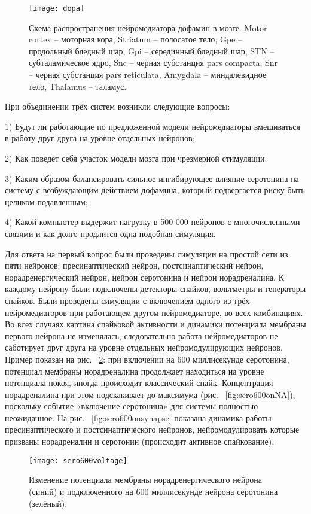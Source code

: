 \begin{figure}
	\centering
	\texttt{[image: dopa]}
	\caption{Схема распространения нейромедиатора дофамин в мозге. Motor cortex – моторная кора, Striatum – полосатое тело, Gpe -- продольный бледный шар, Gpi – серединный бледный шар, STN – субталамическое ядро, Snc -- черная субстанция pars compacta, Snr – черная субстанция pars reticulata, Amygdala – миндалевидное тело, Thalamus – таламус.}
	\label{fig:dopa_scheme}
\end{figure}

При объединении трёх систем возникли следующие вопросы:


1) Будут ли работающие по предложенной модели нейромедиаторы вмешиваться в работу друг друга на уровне отдельных нейронов;


2) Как поведёт себя участок модели мозга при чрезмерной стимуляции.


3) Каким образом балансировать сильное ингибирующее влияние серотонина на систему с возбуждающим действием дофамина, который подвергается риску быть целиком подавленным;


4) Какой компьютер выдержит нагрузку в 500 000 нейронов с многочисленными связями и как долго продлится одна подобная симуляция.


Для ответа на первый вопрос были проведены симуляции на простой сети из пяти нейронов: пресинаптический нейрон, постсинаптический нейрон, норадренергический нейрон, нейрон серотонина и нейрон норадреналина. К каждому нейрону были подключены детекторы спайков, вольтметры и генераторы спайков. Были проведены симуляции с включением одного из трёх нейромедиаторов при работающем другом нейромедиаторе, во всех комбинациях. Во всех случаях картина спайковой активности и динамики потенциала мембраны первого нейрона не изменялась, следовательно работа нейромедиаторов не саботирует друг друга на уровне отдельных нейромодулирующих нейронов. Пример показан на рис. ~\ref{fig:sero600voltage}: при включении на 600 миллисекунде серотонина, потенциал мембраны норадреналина продолжает находиться на уровне потенциала покоя, иногда происходит классический спайк. Концентрация норадреналина при этом подскакивает до максимума (рис. ~\ref{fig:sero600onNA}), поскольку событие «включение серотонина» для системы полностью неожиданное. На рис. ~\ref{fig:sero600onsynapse} показана динамика работы пресинаптического и постсинаптического нейронов, нейромодулировать которые призваны норадреналин и серотонин (происходит активное спайкование).

\begin{figure}
	\centering
	\texttt{[image: sero600voltage]}
	\caption{Изменение потенциала мембраны норадренергического нейрона (синий) и подключенного на 600 миллисекунде нейрона серотонина (зелёный).}
	\label{fig:sero600voltage}
\end{figure}


